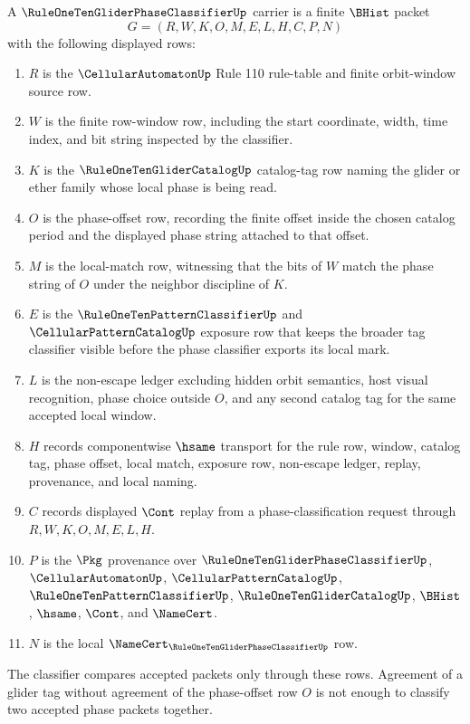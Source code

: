 \begin{definition}
\label{def:rule110-glider-phase-classifier-carrier}
A $\RuleOneTenGliderPhaseClassifierUp$ carrier is a finite $\BHist$ packet
$$
G=(R,W,K,O,M,E,L,H,C,P,N)
$$
with the following displayed rows:
\begin{enumerate}
\item $R$ is the $\CellularAutomatonUp$ Rule 110 rule-table and finite orbit-window source row.
\item $W$ is the finite row-window row, including the start coordinate, width, time index, and bit string inspected by the classifier.
\item $K$ is the $\RuleOneTenGliderCatalogUp$ catalog-tag row naming the glider or ether family whose local phase is being read.
\item $O$ is the phase-offset row, recording the finite offset inside the chosen catalog period and the displayed phase string attached to that offset.
\item $M$ is the local-match row, witnessing that the bits of $W$ match the phase string of $O$ under the neighbor discipline of $K$.
\item $E$ is the $\RuleOneTenPatternClassifierUp$ and $\CellularPatternCatalogUp$ exposure row that keeps the broader tag classifier visible before the phase classifier exports its local mark.
\item $L$ is the non-escape ledger excluding hidden orbit semantics, host visual recognition, phase choice outside $O$, and any second catalog tag for the same accepted local window.
\item $H$ records componentwise $\hsame$ transport for the rule row, window, catalog tag, phase offset, local match, exposure row, non-escape ledger, replay, provenance, and local naming.
\item $C$ records displayed $\Cont$ replay from a phase-classification request through $R,W,K,O,M,E,L,H$.
\item $P$ is the $\Pkg$ provenance over $\RuleOneTenGliderPhaseClassifierUp$, $\CellularAutomatonUp$, $\CellularPatternCatalogUp$, $\RuleOneTenPatternClassifierUp$, $\RuleOneTenGliderCatalogUp$, $\BHist$, $\hsame$, $\Cont$, and $\NameCert$.
\item $N$ is the local $\NameCert_{\RuleOneTenGliderPhaseClassifierUp}$ row.
\end{enumerate}
The classifier compares accepted packets only through these rows. Agreement of a glider tag without agreement of the phase-offset row $O$ is not enough to classify two accepted phase packets together.
\end{definition}

